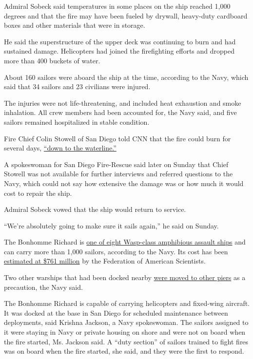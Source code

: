 Admiral Sobeck said temperatures in some places on the ship reached
1,000 degrees and that the fire may have been fueled by drywall,
heavy-duty cardboard boxes and other materials that were in storage.

He said the superstructure of the upper deck was continuing to burn and
had sustained damage. Helicopters had joined the firefighting efforts
and dropped more than 400 buckets of water.

About 160 sailors were aboard the ship at the time, according to the
Navy, which said that 34 sailors and 23 civilians were injured.

The injuries were not life-threatening, and included heat exhaustion and
smoke inhalation. All crew members had been accounted for, the Navy
said, and five sailors remained hospitalized in stable condition.

Fire Chief Colin Stowell of San Diego told CNN that the fire could burn
for several days,
\href{https://twitter.com/cnnbrk/status/1282424297701728262}{``down to
the waterline.''}

A spokeswoman for San Diego Fire-Rescue said later on Sunday that Chief
Stowell was not available for further interviews and referred questions
to the Navy, which could not say how extensive the damage was or how
much it would cost to repair the ship.

Admiral Sobeck vowed that the ship would return to service.

``We're absolutely going to make sure it sails again,'' he said on
Sunday.

The Bonhomme Richard is
\href{https://www.navy.mil/navydata/fact_display.asp?cid=4200\&tid=400\&ct=4}{one
of eight Wasp-class amphibious assault ships} and can carry more than
1,000 sailors, according to the Navy. Its cost has been
\href{https://fas.org/man/dod-101/sys/ship/lhd-1.htm}{estimated at \$761
million} by the Federation of American Scientists.

Two other warships that had been docked nearby
\href{https://twitter.com/SurfaceWarriors/status/1282427073835851777?s=20}{were
moved to other piers} as a precaution, the Navy said.

The Bonhomme Richard is capable of carrying helicopters and fixed-wing
aircraft. It was docked at the base in San Diego for scheduled
maintenance between deployments, said Krishna Jackson, a Navy
spokeswoman. The sailors assigned to it were staying in Navy or private
housing on shore and were not on board when the fire started, Ms.
Jackson said. A ``duty section'' of sailors trained to fight fires was
on board when the fire started, she said, and they were the first to
respond.

